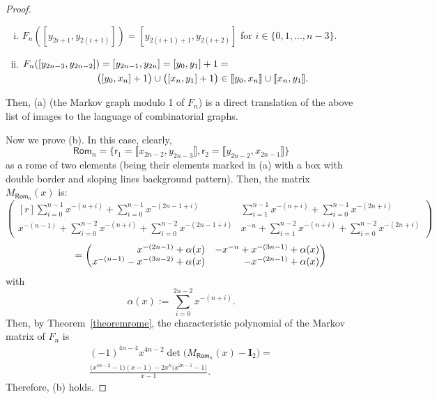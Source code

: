\documentclass[a4paper, 11pt]{amsart}
\numberwithin{equation}{section}
\theoremstyle{customnumberedtheorem}
\theoremstyle{definitionwithbfnote}
\newcommand{\BIclass}[1]{\ensuremath{\llbracket #1\rrbracket}}
\begin{document}
\begin{proof}
\begin{enumerate}[(i)]
\item $F_n([y_{2i+1},y_{2(i+1)}]) = [y_{2(i+1)+1},y_{2(i+2)}]$ for $i \in \{0,1,\dots,n-3\}.$
\item $\begin{multlined}[t][0.85\textwidth]
          F_n([y_{2n-3},y_{2n-2}]) = [y_{2n-1},y_{2n}] = [y_0,y_1] + 1 =\\
                \bigl([y_0, x_n]+1\bigr) \cup \bigl([x_n,y_1]+1\bigr) \in \BIclass{y_0, x_n} \cup \BIclass{x_n,y_1}.
\end{multlined}$
\end{enumerate}
Then, (a) (the Markov graph modulo 1 of $F_n$) is a direct translation
of the above list of images to the language of combinatorial graphs.

Now we prove (b). In this case, clearly,
\[
\textsf{Rom}_n = \{\textsf{r}_1 = \BIclass{x_{2n-2},y_{2n-3}}, \textsf{r}_2 = \BIclass{y_{2n-2},x_{2n-1}}\}
\]
as a rome of two elements
(being their elements marked in (a) with a box with double
border and sloping lines background pattern).
Then, the matrix $M_{\textsf{Rom}_n}(x)$ is:
{\small\[
 \begin{pmatrix*}[r]
   \sum\limits_{i=0}^{n-1} x^{-(n+i)} + \sum\limits_{i=0}^{n-1} x^{-(2n-1+i)}              & \sum\limits_{i=1}^{n-1}x^{-(n+i)} + \sum\limits_{i=0}^{n-1} x^{-(2n+i)}\\[3ex]
   x^{-(n-1)} + \sum\limits_{i=0}^{n-2} x^{-(n+i)} + \sum\limits_{i=0}^{n-2} x^{-(2n-1+i)} & x^{-n} + \sum\limits_{i=1}^{n-2}x^{-(n+i)} + \sum\limits_{i=0}^{n-2} x^{-(2n+i)}
\end{pmatrix*}
\]}\[
\hspace*{4em}= \begin{pmatrix*}[r]
 x^{-(2n-1)}               + \alpha(x) & - x^{-n} + x^{-(3n-1)} + \alpha(x)\\
 x^{-(n-1)}  - x^{-(3n-2)} + \alpha(x) & - x^{-(2n-1)}          + \alpha(x)
\end{pmatrix*}
\]
with
\[
 \alpha(x) := \sum\limits_{i=0}^{2n-2} x^{-(n+i)}.
\]
Then, by Theorem~\ref{theoremrome}, the characteristic polynomial of
the Markov matrix of $F_n$ is
\begin{multline*}
 (-1)^{4n-4} x^{4n-2} \det\bigl(M_{\textsf{Rom}_n}(x) - \mathbf{I}_{2}\bigr) =\\[2ex]
 \frac{\bigl(x^{4n-2}-1\bigr)(x-1) -2x^n\bigl(x^{2n-1} - 1\bigr)}{x-1}.
\end{multline*}
Therefore, (b) holds.
\end{proof}
\end{document}
